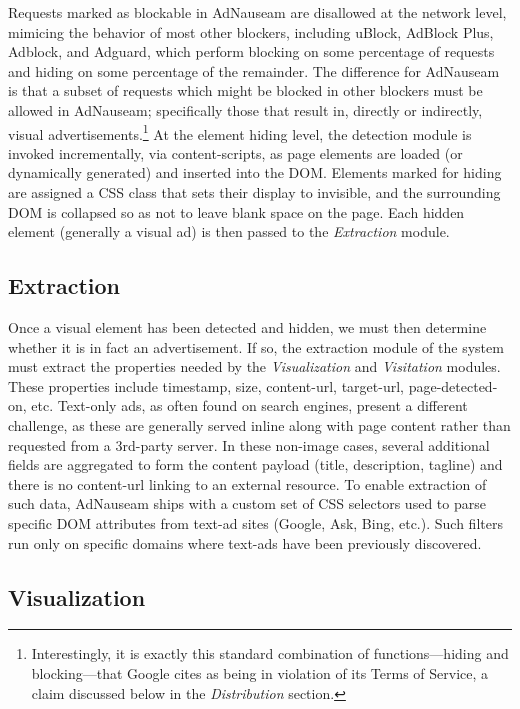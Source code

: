 \documentclass[conference]{IEEEtran}
\begin{document}
Requests marked as blockable in AdNauseam are disallowed at the network level, mimicing the behavior of most other blockers, including uBlock, AdBlock Plus, Adblock, and Adguard, which perform blocking on some percentage of requests and hiding on some percentage of the remainder. The difference for AdNauseam is that a subset of requests which might be blocked in other blockers must be allowed in AdNauseam; specifically those that result in, directly or indirectly, visual advertisements.\footnote{Interestingly, it is exactly this standard combination of functions---hiding and blocking---that Google cites as being in violation of its Terms of Service, a claim discussed below in the \emph{Distribution} section.} At the element hiding level, the detection module is invoked incrementally, via content-scripts, as page elements are loaded (or dynamically generated) and inserted into the DOM. Elements marked for hiding are assigned a CSS class that sets their display to invisible, and the surrounding DOM is collapsed so as not to leave blank space on the page. Each hidden element (generally a visual ad) is then passed to the \emph{Extraction} module.


\subsection{Extraction}

Once a visual element has been detected and hidden, we must then determine whether it is in fact an advertisement. If so, the extraction module of the system must extract the properties needed by the \emph{Visualization} and \emph{Visitation} modules. These properties include timestamp, size, content-url, target-url, page-detected-on, etc. Text-only ads, as often found on search engines, present a different challenge, as these are generally served inline along with page content rather than requested from a 3rd-party server. In these non-image cases, several additional fields are aggregated to form the content payload (title, description, tagline) and there is no content-url linking to an external resource. To enable extraction of such data, AdNauseam ships with a custom set of CSS selectors used to parse specific DOM attributes from text-ad sites (Google, Ask, Bing, etc.). Such filters run only on specific domains where text-ads have been previously discovered.


\subsection{Visualization}
\end{document}
